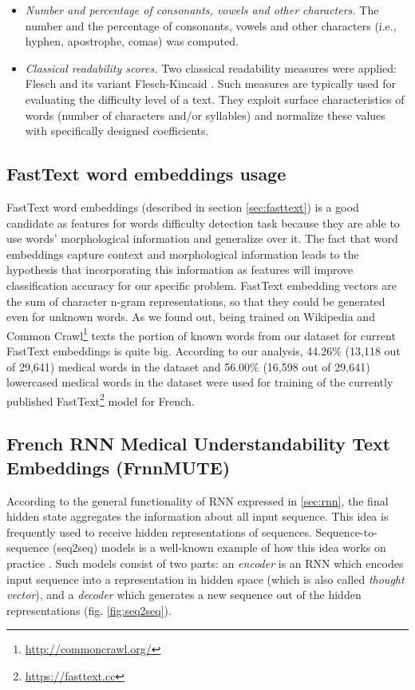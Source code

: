 \begin{itemize}
\item {\it Number and percentage of consonants, vowels and other
    characters.} The number and the percentage of
  consonants, vowels and other characters (i.e., hyphen, apostrophe,
  comas) was computed.
\item {\it Classical readability scores.} Two classical
  readability measures were applied: Flesch \citep{Flesch1948} and its variant Flesch-Kincaid \citep{Kincaid-1975}. Such measures are typically used for evaluating the difficulty level of a text. They exploit surface
  characteristics of words (number of characters and/or syllables) and
  normalize these values with specifically designed coefficients.
\end{itemize}


\subsection{FastText word embeddings usage}

FastText word embeddings (described in section \ref{sec:fasttext}) is a good candidate as features for words difficulty detection task because they are able to use words' morphological information and generalize over it. The fact that word embeddings capture context and morphological information leads to the hypothesis that incorporating this information as features will improve classification accuracy for our specific problem. FastText embedding vectors are the sum of character n-gram representations, so that they could be generated even for unknown words. As we found out, being trained on Wikipedia and Common Crawl\footnote{\url{http://commoncrawl.org/}} texts the portion of known words from our dataset for current FastText embeddings is quite big. According to our analysis, 44.26\% (13,118 out of 29,641) medical words in the dataset and 56.00\% (16,598 out of 29,641) lowercased medical words in the dataset were used for training of the currently published FastText\footnote{\url{https://fasttext.cc}} model for French.

\subsection{French RNN Medical Understandability Text Embeddings (FrnnMUTE)}
\label{sec:frnnmute-learning}

According to the general functionality of RNN expressed in \ref{sec:rnn}, the final hidden state aggregates the information about all input sequence. This idea is frequently used to receive hidden representations of sequences. Sequence-to-sequence (seq2seq) models is a well-known example of how this idea works on practice \citep{Sutskever-NIPS2014}. Such models consist of two parts: an \textit{encoder} is an RNN which encodes input sequence into a representation in hidden space (which is also called \textit{thought vector}), and a \textit{decoder} which generates a new sequence out of the hidden representations (fig. \ref{fig:seq2seq}). 

